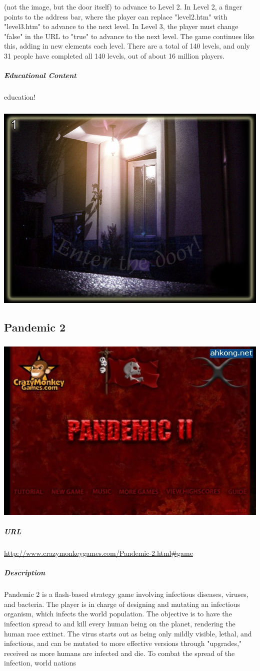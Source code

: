 (not the image, but the door itself) to advance to Level 2. In Level 2, a finger points to the address bar, where the player can replace "level2.htm" with "level3.htm" to advance to the next level. In Level 3, the player must change "false" in the URL to "true" to advance to the next level. The game continues like this, adding in new elements each level. There are a total of 140 levels, and only 31 people have completed all 140 levels, out of about 16 million players.\subparagraph{Educational Content}education!\subparagraph{}\includegraphics[width = \textwidth]{img/notpron_screen.jpg}\newpage\subsection{Pandemic 2}\subparagraph{}\includegraphics[width = \textwidth]{img/pandemic_title.jpg}\subparagraph{URL}\url{http://www.crazymonkeygames.com/Pandemic-2.html#game}\subparagraph{Description}Pandemic 2 is a flash-based strategy game involving infectious diseases, viruses, and bacteria. The player is in charge of designing and mutating an infectious organism, which infects the world population. The objective is to have the infection spread to and kill every human being on the planet, rendering the human race extinct. The virus starts out as being only mildly visible, lethal, and infectious, and can be mutated to more effective versions through "upgrades," received as more humans are infected and die. To combat the spread of the infection, world nations 
